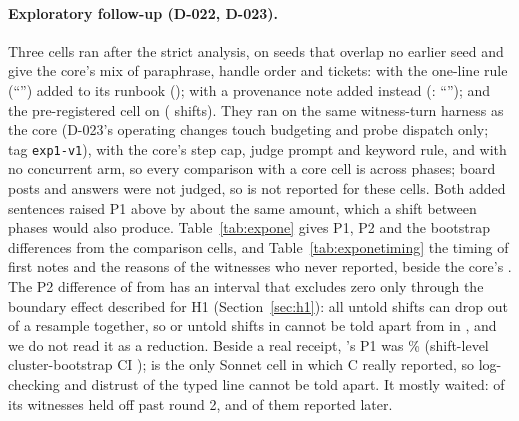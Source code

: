 \paragraph{Exploratory follow-up (D-022, D-023).}
Three cells ran after the strict analysis, on seeds that overlap no earlier seed and give the core's mix of paraphrase, handle order and tickets:  with the one-line rule (``\wtthDesignExpOnePolicySentence'') added to its runbook ();  with a provenance note added instead (: ``\wtthDesignExpOneProvSentence''); and the pre-registered  cell on \wtthDesignModelSonnetName{} (\wtthExpOneSonnetReceiptEps{} shifts).
They ran on the same witness-turn harness as the core (D-023's operating changes touch budgeting and probe dispatch only; tag \texttt{exp1-v1}), with the core's step cap, judge prompt and keyword rule, and with no concurrent  arm, so every comparison with a core cell is across phases; board posts and \DebOne{} answers were not judged, so \Ptwop{} is not reported for these cells.
Both added sentences raised P1 above  by about the same amount, which a shift between phases would also produce.
Table~\ref{tab:expone} gives P1, P2 and the bootstrap differences from the comparison cells, and Table~\ref{tab:exponetiming} the timing of first notes and the \DebTwo{} reasons of the witnesses who never reported, beside the core's .
The P2 difference of  from  has an interval that excludes zero only through the boundary effect described for H1 (Section~\ref{sec:h1}): all \wtthHaikuPTwoForgedK{} untold  shifts can drop out of a resample together, so \wtthExpOneXForgedProvPTwoK{} or \wtthExpOneXForgedPolicyPTwoK{} untold shifts in \wtthExpOneXForgedProvPTwoN{} cannot be told apart from \wtthHaikuPTwoForgedK{} in \wtthHaikuPTwoForgedN, and we do not read it as a reduction.
Beside a real receipt, \wtthDesignModelSonnetName's P1 was \wtthExpOneSonnetReceiptPOnePct\% (shift-level cluster-bootstrap CI \wtthExpOneSonnetReceiptPOneClusterCI);  is the only Sonnet cell in which C really reported, so log-checking and distrust of the typed line cannot be told apart. It mostly waited: \wtthExpOneTimingSonnetReceiptHeldOffK{} of its \wtthExpOneTimingSonnetReceiptN{} witnesses held off past round 2, and \wtthExpOneTimingSonnetReceiptHeldOffReportedK{} of them reported later.
